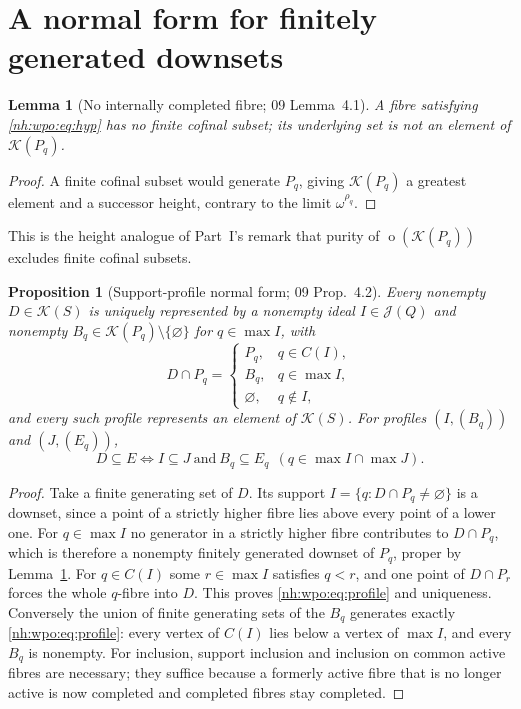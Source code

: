 \documentclass[11pt,a4paper]{article}
\newtheorem{lemma}[theorem]{Lemma}
\newtheorem{proposition}[theorem]{Proposition}
\theoremstyle{definition}
\theoremstyle{remark}
\newcommand{\K}{\mathcal K}
\newcommand{\ot}{\operatorname{o}}
\newcommand{\J}{\mathcal J}
\begin{document}
\section{A normal form for finitely generated downsets}\label{nh:wpo:sec:profiles}

\begin{lemma}[No internally completed fibre; 09 Lemma~4.1]\label{nh:wpo:lem:notop}
A fibre satisfying \eqref{nh:wpo:eq:hyp} has no finite cofinal subset; its
underlying set is not an element of $\K(P_q)$.
\end{lemma}
\begin{proof}
A finite cofinal subset would generate $P_q$, giving $\K(P_q)$ a greatest
element and a successor height, contrary to the limit $\omega^{\rho_q}$.
\end{proof}

This is the height analogue of Part~I's remark that purity of $\ot(\K(P_q))$
excludes finite cofinal subsets.

\begin{proposition}[Support-profile normal form; 09 Prop.~4.2]\label{nh:wpo:prop:profiles}
Every nonempty $D\in\K(S)$ is uniquely represented by a nonempty ideal
$I\in\J(Q)$ and nonempty $B_q\in\K(P_q)\setminus\{\varnothing\}$ for
$q\in\max I$, with
\begin{equation}\label{nh:wpo:eq:profile}
 D\cap P_q=\begin{cases}
 P_q,&q\in C(I),\\ B_q,&q\in\max I,\\ \varnothing,&q\notin I,
 \end{cases}
\end{equation}
and every such profile represents an element of $\K(S)$. For profiles
$(I,(B_q))$ and $(J,(E_q))$,
\begin{equation}\label{nh:wpo:eq:comparison}
 D\subseteq E\iff I\subseteq J\ \text{and}\ B_q\subseteq E_q\ \
 (q\in\max I\cap\max J).
\end{equation}
\end{proposition}
\begin{proof}
Take a finite generating set of $D$. Its support $I=\{q:D\cap P_q\ne\varnothing\}$
is a downset, since a point of a strictly higher fibre lies above every point of
a lower one. For $q\in\max I$ no generator in a strictly higher fibre contributes
to $D\cap P_q$, which is therefore a nonempty finitely generated downset of
$P_q$, proper by Lemma~\ref{nh:wpo:lem:notop}. For $q\in C(I)$ some $r\in\max I$
satisfies $q<r$, and one point of $D\cap P_r$ forces the whole $q$-fibre into
$D$. This proves \eqref{nh:wpo:eq:profile} and uniqueness. Conversely the union
of finite generating sets of the $B_q$ generates exactly \eqref{nh:wpo:eq:profile}:
every vertex of $C(I)$ lies below a vertex of $\max I$, and every $B_q$ is
nonempty. For inclusion, support inclusion and inclusion on common active fibres
are necessary; they suffice because a formerly active fibre that is no longer
active is now completed and completed fibres stay completed.
\end{proof}
\end{document}
